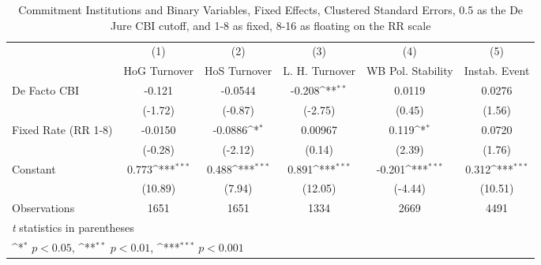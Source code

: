 \begin{table}[htbp]\centering
\def\sym#1{\ifmmode^{#1}\else\(^{#1}\)\fi}
\caption{Commitment Institutions and Binary Variables, Fixed Effects, Clustered Standard Errors, 0.5 as the De Jure CBI cutoff, and 1-8 as fixed, 8-16 as floating on the RR scale \label{binaryIndFEDF}}
\begin{tabular}{l*{5}{c}}
\toprule
                                        &\multicolumn{1}{c}{(1)}&\multicolumn{1}{c}{(2)}&\multicolumn{1}{c}{(3)}&\multicolumn{1}{c}{(4)}&\multicolumn{1}{c}{(5)}\\
                                        &\multicolumn{1}{c}{HoG Turnover}&\multicolumn{1}{c}{HoS Turnover}&\multicolumn{1}{c}{L. H. Turnover}&\multicolumn{1}{c}{WB Pol. Stability}&\multicolumn{1}{c}{Instab. Event}\\
\midrule
De Facto CBI                            &   -0.121         &  -0.0544         &   -0.208\sym{**} &   0.0119         &   0.0276         \\
                                        &  (-1.72)         &  (-0.87)         &  (-2.75)         &   (0.45)         &   (1.56)         \\
\addlinespace
Fixed Rate (RR 1-8)                     &  -0.0150         &  -0.0886\sym{*}  &  0.00967         &    0.119\sym{*}  &   0.0720         \\
                                        &  (-0.28)         &  (-2.12)         &   (0.14)         &   (2.39)         &   (1.76)         \\
\addlinespace
Constant                                &    0.773\sym{***}&    0.488\sym{***}&    0.891\sym{***}&   -0.201\sym{***}&    0.312\sym{***}\\
                                        &  (10.89)         &   (7.94)         &  (12.05)         &  (-4.44)         &  (10.51)         \\
\midrule
Observations                            &     1651         &     1651         &     1334         &     2669         &     4491         \\
\bottomrule
\multicolumn{6}{l}{\footnotesize \textit{t} statistics in parentheses}\\
\multicolumn{6}{l}{\footnotesize \sym{*} \(p<0.05\), \sym{**} \(p<0.01\), \sym{***} \(p<0.001\)}\\
\end{tabular}
\end{table}
